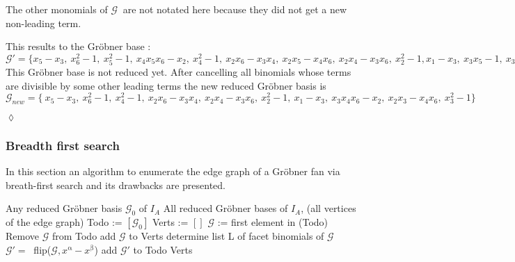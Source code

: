 \begin{env_example}
The other monomials of $\mathcal{G}~$ are not notated here because they did not get a new non-leading term.

This results to the Gröbner base : \\
$\mathcal{G}' = \{x_{5}-x_{3},~x_{6}^{2}-1,~x_{5}^{2}-1,~x_{4}x_{5}x_{6}-x_{2},~x_{4}^{2}-1,~ x_{2}x_{6}-x_{3}x_{4},~x_{2}x_{5}-x_{4}x_{6},~x_{2}x_{4}-x_{3}x_{6} ,~x_{2}^{2}-1,x_{1}-x_{3},~x_{3}x_{5}-1,~x_{3}x_{4}x_{6}-x_{2},~x_{2}x_{3}-x_{4}x_{6},~x_{3}^{2}-1 \}$ \\
This Gröbner base is not reduced yet. After cancelling all binomials whose terms are divisible by some other leading terms the new reduced Gröbner basis is 
$\mathcal{G}_{new} = \{~x_{5}-x_{3},~x_{6}^{2}-1,~x_{4}^{2}-1,~x_{2}x_{6}-x_{3}x_{4},~x_{2}x_{4}-x_{3}x_{6},~x_{2}^{2}-1,~x_{1}-x_{3},~x_{3}x_{4}x_{6}-x_{2},~x_{2}x_{3}-x_{4}x_{6},~x_{3}^{2}-1 \} $

\begin{flushright}
$\lozenge$
\end{flushright}
\end{env_example}


\subsubsection{Breadth first search}

In this section an algorithm to enumerate the edge graph of a Gröbner fan via breath-first search and its drawbacks are presented.

\begin{algorithm}
\caption{Enumerating the edge graph of the Gröbner fan via breath-first search \cite{tigers}}
\label{alg:breath}
\begin{algorithmic}[1]

\Input
Any reduced Gröbner basis $ \mathcal{G}_0 $ of $I_A$
\Output All reduced Gröbner bases of $I_A$, (all vertices of the edge graph)
\State Todo := $\left[ \mathcal{G}_0 \right]  $
\State Verts := $\left[ \right] $
\State $\mathcal{G}$ := first element in (Todo)
\State Remove $\mathcal{G} $ from Todo
\State add $\mathcal{G}$ to Verts 
\State determine list L of facet binomials of $\mathcal{G} $
 \State $\mathcal{G}' =~$ flip($\mathcal{G},x^{\upalpha} - x^{\upbeta} $)
 \State add $\mathcal{G}'$ to Todo
 \EndIf
 \EndFor
\EndWhile 
\Return Verts

\end{algorithmic}
\end{algorithm}

